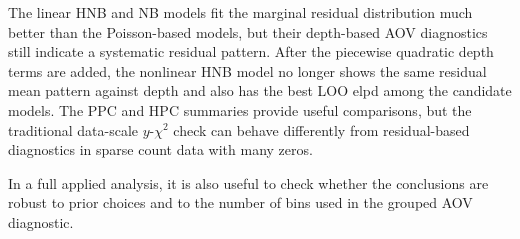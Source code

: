 \documentclass[
  english,
  letterpaper,
  DIV=11,
  numbers=noendperiod]{scrartcl}
\begin{document}
The linear HNB and NB models fit the marginal residual distribution much
better than the Poisson-based models, but their depth-based AOV
diagnostics still indicate a systematic residual pattern. After the
piecewise quadratic depth terms are added, the nonlinear HNB model no
longer shows the same residual mean pattern against depth and also has
the best LOO elpd among the candidate models. The PPC and HPC summaries
provide useful comparisons, but the traditional data-scale
\(y\)-\(\chi^2\) check can behave differently from residual-based
diagnostics in sparse count data with many zeros.

In a full applied analysis, it is also useful to check whether the
conclusions are robust to prior choices and to the number of bins used
in the grouped AOV diagnostic.
\end{document}
